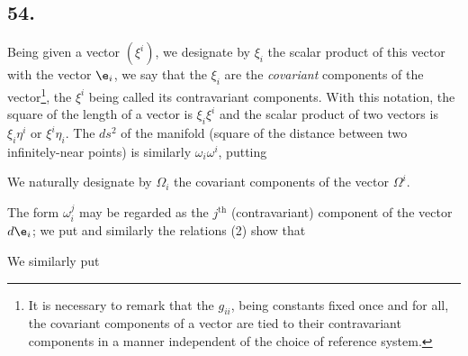 \subsection*{54.}

Being given a vector $(\xi^i)$, we designate by $\xi_i$ the scalar product of this vector with the vector $\e_i$,
we say that the $\xi_i$ are the \textit{covariant} components of the vector\footnote{It is necessary to remark that the $g_{ii}$, being constants fixed once and for all, the covariant components of a vector are tied to their contravariant components in a manner independent of the choice of reference system.}, the $\xi^i$ being called its contravariant components. With this notation, the square of the length of a vector is $\xi_i \xi^i$ and the scalar product of two vectors is $\xi_i \eta^i$ or $\xi^i \eta_i$. The $ds^2$ of the manifold (square of the distance between two infinitely-near points) is similarly $\omega_i \omega^i$, putting

We naturally designate by $\Omega_i$ the covariant components of the vector $\Omega^i$.

The form $\omega_i^j$ may be regarded as the $j^\text{th}$ (contravariant) component of the vector $d\e_i$; we put
and similarly
the relations (2) show that

We similarly put
